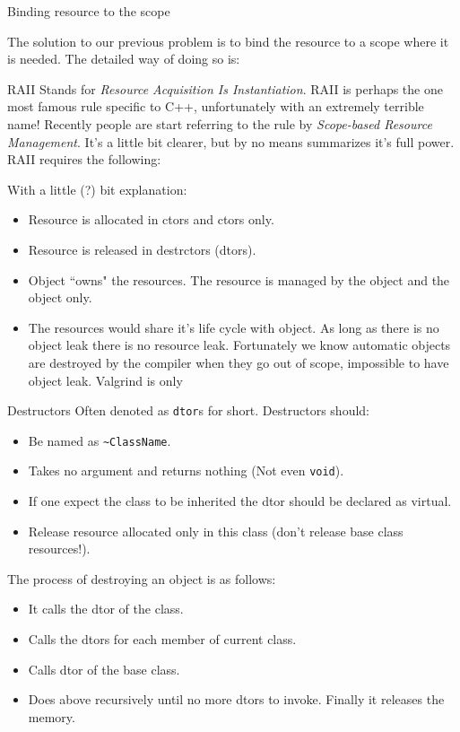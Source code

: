 \begin{frame}{Binding resource to the scope}

The solution to our previous problem is to bind the resource to a scope where it is needed. The detailed way of doing so is:
\end{frame}



\begin{frame}{RAII}
\small
Stands for \textit{Resource Acquisition Is Instantiation}. RAII is perhaps the one most famous rule specific to C++, unfortunately with an extremely terrible name! Recently people are start referring to the rule by \textit{Scope-based Resource Management}. It's a little bit clearer, but by no means summarizes it's full power. RAII requires the following:
\begin{center}
\end{center}
With a little (?) bit explanation:
\begin{itemize}
\small
\item Resource is allocated in ctors and ctors only.
\item Resource is released in destrctors (dtors).
\item Object ``owns" the resources. The resource is managed by the object and the object only. 
\item The resources would share it's life cycle with object. As long as there is no object leak there is no resource leak. Fortunately we know automatic objects are destroyed by the compiler when they go out of scope, impossible to have object leak.
Valgrind is only 
\end{itemize}
\end{frame}

\begin{frame}{Destructors}
Often denoted as \texttt{dtor}s for short. Destructors should:
\begin{itemize}
\item Be named as \texttt{\textasciitilde ClassName}.
\item Takes no argument and returns nothing (Not even \texttt{void}).
\item If one expect the class to be inherited the dtor should be declared as virtual.
\item Release resource allocated only in this class (don't release base class resources!).
\end{itemize}
The process of destroying an object is as follows:
\begin{itemize}
\item It calls the dtor of the class.
\item Calls the dtors for each member of \alert{current} class.
\item Calls dtor of the base class.
\item Does above recursively until no more dtors to invoke. Finally it releases the memory.
\end{itemize}
\end{frame}


